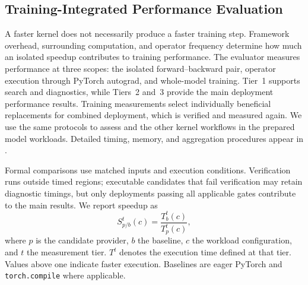 \subsection{Training-Integrated Performance Evaluation}
\label{sec:evaluation_protocol}

A faster kernel does not necessarily produce a faster training step. Framework overhead, surrounding computation, and operator frequency determine how much an isolated speedup contributes to training performance. The evaluator measures performance at three scopes: the isolated forward--backward pair, operator execution through PyTorch autograd, and whole-model training. Tier~1 supports search and diagnostics, while Tiers~2 and~3 provide the main deployment performance results. Training measurements select individually beneficial replacements for combined deployment, which is verified and measured again. We use the same protocols to assess \method and the other kernel workflows in the prepared model workloads. Detailed timing, memory, and aggregation procedures appear in .

Formal comparisons use matched inputs and execution conditions. Verification runs outside timed regions; executable candidates that fail verification may retain diagnostic timings, but only deployments passing all applicable gates contribute to the main results. We report speedup as
\begin{equation}
    S^t_{p/b}(c) = \frac{T^t_b(c)}{T^t_p(c)},
    \label{eq:evaluation_speedup}
\end{equation}
where $p$ is the candidate provider, $b$ the baseline, $c$ the workload configuration, and $t$ the measurement tier. $T^t$ denotes the execution time defined at that tier. Values above one indicate faster execution. Baselines are eager PyTorch and \texttt{torch.compile} where applicable.

